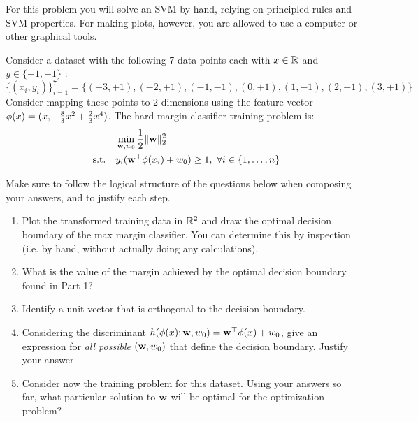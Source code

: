 \documentclass[submit]{harvardml}
\begin{document}
\begin{problem}

  For this problem you will solve an SVM by hand, relying on principled rules and SVM properties. 
  For making plots, however, you are allowed to use a computer or other graphical tools.

Consider a dataset with the following 7 data points each with $x \in \mathbb{R}$ and $y \in \{ -1, +1 \}$ : \[\{(x_i, y_i)\}_{i = 1}^7 =\{(-3 , +1) , (-2 , +1 ) , (-1,  -1 ), (0, +1), ( 1 , -1 ), ( 2 , +1 ) , (3 , +1 )\}\] Consider
mapping these points to $2$ dimensions using the feature vector $\mathbf{\phi}(x) =  (x, -\frac{8}{3}x^2 + \frac{2}{3}x^4 )$. The hard margin classifier training problem is:
%
\begin{align*}
  &\min_{\mathbf{w}, w_0} \frac{1}{2}\|\mathbf{w}\|_2^2 \label{eq:dcp} \\
  \quad \text{s.t.} \quad & y_i(\mathbf{w}^\top \mathbf{\phi}(x_i) + w_0) \geq 1,~\forall i \in \{1,\ldots, n\}\notag
\end{align*}

Make sure to follow the logical structure of
the questions below when composing your answers, and to justify each step.

\begin{enumerate}
\item Plot the transformed training data in $\mathbb{R}^2$ and draw the optimal decision boundary
of the max margin classifier. You can determine this by inspection (i.e. by hand, without actually doing any calculations).

\item  What is the value of the margin achieved by the optimal
decision boundary found in Part 1? 

\item Identify a unit vector that is orthogonal to the decision boundary.

\item Considering the discriminant $h(\mathbf{\phi}(x);\mathbf{w},w_0)=\mathbf{w}^\top\mathbf{\phi}(x) +w_0$, 
give an expression for {\em all possible} $(\mathbf{w},w_0)$ that define
the decision boundary. Justify your answer.

  \item Consider now the training problem for this dataset. Using your answers so far,
    what particular solution to $\mathbf{w}$ will be optimal for the
    optimization problem?


\end{enumerate}
\end{problem}
\end{document}
